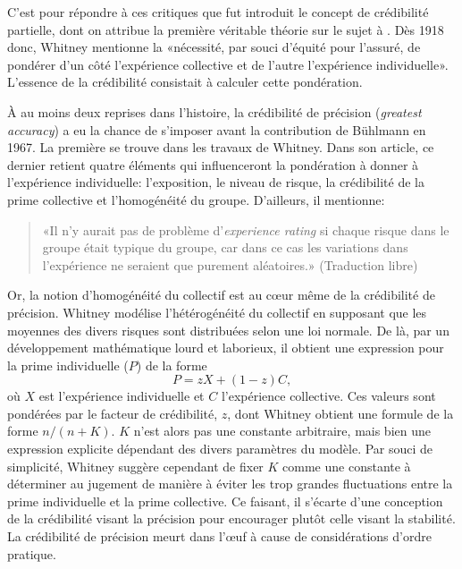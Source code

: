 C'est pour répondre à ces critiques que fut introduit le concept de
crédibilité partielle, dont on attribue la première véritable théorie
sur le sujet à \cite{Whitney:1918}. Dès 1918 donc, Whitney mentionne la
«nécessité, par souci d'équité pour l'assuré, de pondérer d'un côté
l'expérience collective et de l'autre l'expérience individuelle».
L'essence de la crédibilité consistait à calculer cette pondération.

À au moins deux reprises dans l'histoire, la crédibilité de précision
(\emph{greatest accuracy}) a eu la chance de s'imposer avant la
contribution de Bühlmann en 1967. La première se trouve dans les
travaux de Whitney. Dans son article, ce dernier retient quatre
éléments qui influenceront la pondération à donner à l'expérience
individuelle: l'exposition, le niveau de risque, la crédibilité de la
prime collective et l'homogénéité du groupe. D'ailleurs, il mentionne:

\begin{quote}
  «Il n'y aurait pas de problème d'\emph{experience rating} si chaque
  risque dans le groupe était typique du groupe, car dans ce cas les
  variations dans l'expérience ne seraient que purement aléatoires.»
  (Traduction libre)
\end{quote}

Or, la notion d'homogénéité du collectif est au c{\oe}ur même de la
crédibilité de précision. Whitney modélise l'hétérogénéité du
collectif en supposant que les moyennes des divers risques sont
distribuées selon une loi normale. De là, par un développement
mathématique lourd et laborieux, il obtient une expression pour la
prime individuelle ($P$) de la forme
\begin{equation*}
  P=zX+(1-z)C,
\end{equation*}
où $X$ est l'expérience individuelle et $C$ l'expérience collective.
Ces valeurs sont pondérées par le facteur de crédibilité, $z$, dont
Whitney obtient une formule de la forme \begin{math} n/(n+K)
\end{math}. $K$ n'est alors pas une constante arbitraire, mais bien
une expression explicite dépendant des divers paramètres du modèle.
Par souci de simplicité, Whitney suggère cependant de fixer $K$ comme
une constante à déterminer au jugement de manière à éviter les trop
grandes fluctuations entre la prime individuelle et la prime
collective. Ce faisant, il s'écarte d'une conception de la crédibilité
visant la précision pour encourager plutôt celle visant la stabilité.
La crédibilité de précision meurt dans l'{\oe}uf à cause de
considérations d'ordre pratique.

